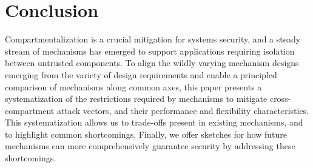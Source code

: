 \section{Conclusion}
\label{sec:compsok:conclusion}
Compartmentalization is a crucial mitigation for systems security, and a steady
stream of mechanisms has emerged to support applications requiring isolation
between untrusted components.
To align the wildly varying mechanism designs emerging from the variety of
design requirements and enable a principled comparison of mechanisms along 
common axes, this paper presents a systematization of the restrictions required
by mechanisms to mitigate cross-compartment attack vectors, and their performance
and flexibility characteristics.
This systematization allows us to trade-offs present in existing mechanisms,
and to highlight common shortcomings.
Finally, we offer sketches for how future mechanisms can more comprehensively
guarantee security by addressing these shortcomings.
